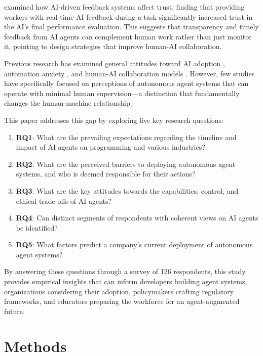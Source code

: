 \documentclass{article}
\providecommand{\tightlist}{%
  \setlength{\itemsep}{0pt}%
  \setlength{\parskip}{0pt}}
\begin{document}
\cite{Brown2025} examined how AI-driven feedback systems affect
trust, finding that providing workers with real-time AI feedback during
a task significantly increased trust in the AI's final performance
evaluation. This suggests that transparency and timely feedback from AI
agents can complement human work rather than just monitor it, pointing
to design strategies that improve human-AI collaboration.

Previous research has examined general attitudes toward AI adoption
\citep{DavenportRonanki2018}, automation anxiety \citep{Frey2017}, and human-AI collaboration models \citep{Seeber2020}. However,
few studies have specifically focused on perceptions of autonomous agent systems that can operate with minimal human supervision---a distinction that fundamentally changes the human-machine relationship.

This paper addresses this gap by exploring five key research questions:

\begin{enumerate}
\def\labelenumi{\arabic{enumi}.}
\tightlist
\item
  \textbf{RQ1}: What are the prevailing expectations regarding the
  timeline and impact of AI agents on programming and various
  industries?
\item
  \textbf{RQ2}: What are the perceived barriers to deploying autonomous
  agent systems, and who is deemed responsible for their actions?
\item
  \textbf{RQ3}: What are the key attitudes towards the capabilities,
  control, and ethical trade-offs of AI agents?
\item
  \textbf{RQ4}: Can distinct segments of respondents with coherent views
  on AI agents be identified?
\item
  \textbf{RQ5}: What factors predict a company's current deployment of
  autonomous agent systems?
\end{enumerate}

By answering these questions through a survey of 126 respondents, this
study provides empirical insights that can inform developers building
agent systems, organizations considering their adoption, policymakers
crafting regulatory frameworks, and educators preparing the workforce
for an agent-augmented future.

\section{Methods}\label{methods}
\end{document}
